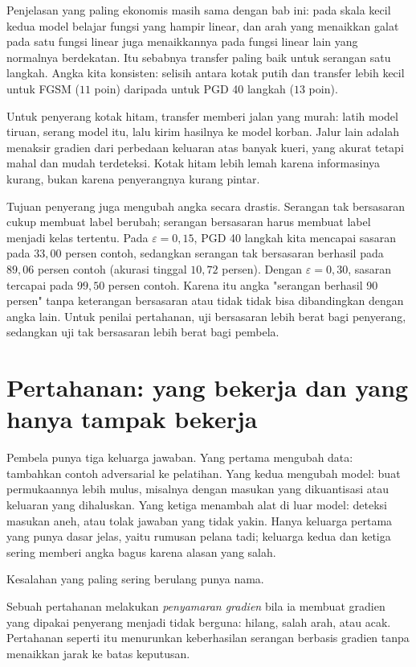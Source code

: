Penjelasan yang paling ekonomis masih sama dengan bab ini: pada skala kecil kedua model
belajar fungsi yang hampir linear, dan arah yang menaikkan galat pada satu fungsi linear
juga menaikkannya pada fungsi linear lain yang normalnya berdekatan. Itu sebabnya
transfer paling baik untuk serangan satu langkah. Angka kita konsisten: selisih antara
kotak putih dan transfer lebih kecil untuk FGSM ($11$ poin) daripada untuk PGD 40
langkah ($13$ poin).

Untuk penyerang kotak hitam, transfer memberi jalan yang murah: latih model tiruan,
serang model itu, lalu kirim hasilnya ke model korban. Jalur lain adalah menaksir
gradien dari perbedaan keluaran atas banyak kueri, yang akurat tetapi mahal dan mudah
terdeteksi. Kotak hitam lebih lemah karena informasinya kurang, bukan karena
penyerangnya kurang pintar.

Tujuan penyerang juga mengubah angka secara drastis. Serangan tak bersasaran cukup
membuat label berubah; serangan bersasaran harus membuat label menjadi kelas tertentu.
Pada $\varepsilon=0{,}15$, PGD 40 langkah kita mencapai sasaran pada $33{,}00$ persen
contoh, sedangkan serangan tak bersasaran berhasil pada $89{,}06$ persen contoh
(akurasi tinggal $10{,}72$ persen). Dengan $\varepsilon=0{,}30$, sasaran tercapai
pada $99{,}50$ persen contoh. Karena itu angka "serangan berhasil 90 persen" tanpa
keterangan bersasaran atau tidak tidak bisa dibandingkan dengan angka lain. Untuk
penilai pertahanan, uji bersasaran lebih berat bagi penyerang, sedangkan uji tak
bersasaran lebih berat bagi pembela.

\section{Pertahanan: yang bekerja dan yang hanya tampak bekerja}

Pembela punya tiga keluarga jawaban. Yang pertama mengubah data: tambahkan contoh
adversarial ke pelatihan. Yang kedua mengubah model: buat permukaannya lebih mulus,
misalnya dengan masukan yang dikuantisasi atau keluaran yang dihaluskan. Yang ketiga
menambah alat di luar model: deteksi masukan aneh, atau tolak jawaban yang tidak
yakin. Hanya keluarga pertama yang punya dasar jelas, yaitu rumusan pelana tadi;
keluarga kedua dan ketiga sering memberi angka bagus karena alasan yang salah.

Kesalahan yang paling sering berulang punya nama.

\begin{definisi}
Sebuah pertahanan melakukan \emph{penyamaran gradien} bila ia membuat gradien yang
dipakai penyerang menjadi tidak berguna: hilang, salah arah, atau acak. Pertahanan
seperti itu menurunkan keberhasilan serangan berbasis gradien tanpa menaikkan jarak
ke batas keputusan.
\end{definisi}

